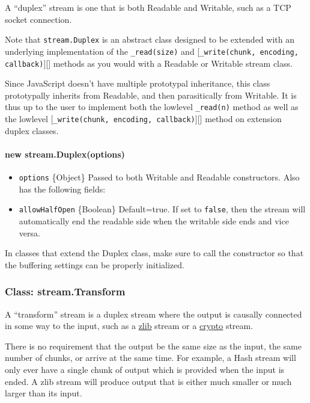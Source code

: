 A ``duplex'' stream is one that is both Readable and Writable, such as a
TCP socket connection.

Note that \texttt{stream.Duplex} is an abstract class designed to be
extended with an underlying implementation of the \texttt{\_read(size)}
and {[}\texttt{\_write(chunk, encoding, callback)}{]}{[}{]} methods as
you would with a Readable or Writable stream class.

Since JavaScript doesn't have multiple prototypal inheritance, this
class prototypally inherits from Readable, and then parasitically from
Writable. It is thus up to the user to implement both the lowlevel
\texttt{\_read(n)} method as well as the lowlevel
{[}\texttt{\_write(chunk, encoding, callback)}{]}{[}{]} method on
extension duplex classes.

\paragraph{new stream.Duplex(options)}

\begin{itemize}
\item
  \texttt{options} \{Object\} Passed to both Writable and Readable
  constructors. Also has the following fields:
\item
  \texttt{allowHalfOpen} \{Boolean\} Default=true. If set to
  \texttt{false}, then the stream will automatically end the readable
  side when the writable side ends and vice versa.
\end{itemize}

In classes that extend the Duplex class, make sure to call the
constructor so that the buffering settings can be properly initialized.

\subsubsection{Class: stream.Transform}

A ``transform'' stream is a duplex stream where the output is causally
connected in some way to the input, such as a \href{zlib.html}{zlib}
stream or a \href{crypto.html}{crypto} stream.

There is no requirement that the output be the same size as the input,
the same number of chunks, or arrive at the same time. For example, a
Hash stream will only ever have a single chunk of output which is
provided when the input is ended. A zlib stream will produce output that
is either much smaller or much larger than its input.

